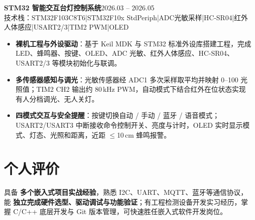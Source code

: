 \documentclass[10pt,a4paper]{article}
\newcommand{\projectblock}[3]{%
    {\bfseries\color{darktext}#1}\hfill{\color{graytext}#2}\\%
    {\small\color{graytext}#3}%
    \vspace{0.2em}%
}
\begin{document}
\projectblock{STM32 智能交互台灯控制系统}{2026.03 -- 2026.05}{技术栈：STM32F103C8T6\hspace{0.3em}|\hspace{0.3em}STM32F10x StdPeriph\hspace{0.3em}|\hspace{0.3em}ADC光敏采样\hspace{0.3em}|\hspace{0.3em}HC-SR04\hspace{0.3em}|\hspace{0.3em}红外人体感应\hspace{0.3em}|\hspace{0.3em}USART2/3\hspace{0.3em}|\hspace{0.3em}TIM2 PWM\hspace{0.3em}|\hspace{0.3em}OLED}

\begin{itemize}[leftmargin=1.5em, itemsep=2pt, parsep=0pt, topsep=2pt]
    \item \textbf{裸机工程与外设驱动}：基于 Keil MDK 与 STM32 标准外设库搭建工程，完成 LED、蜂鸣器、按键、OLED、ADC 光敏、红外人体感应、HC-SR04、USART2/3 等模块初始化与联调。
    \item \textbf{多传感器感知与调光}：光敏传感器经 ADC1 多次采样取平均并映射 0--100 光照值；TIM2 CH2 输出约 80\,kHz PWM，自动模式下结合红外在位状态实现有人分档调光、无人关灯。
    \item \textbf{四模式交互与安全提醒}：按键切换自动 / 手动 / 蓝牙 / 语音模式；USART2/USART3 中断接收命令控制开关、亮度与计时，OLED 实时显示模式、灯态、光照和距离，近距 $\leq$10\,cm 蜂鸣报警。
\end{itemize}

\vspace{0.1em}

\section{\faUser\hspace{0.4em}个人评价}

具备 \textbf{多个嵌入式项目实战经验}，熟悉 I2C、UART、MQTT、蓝牙等通信协议，能 \textbf{独立完成硬件选型、驱动调试与功能验证}；有工程检测设备开发实习经历，掌握 C/C++ 底层开发与 Git 版本管理，可快速胜任嵌入式软件开发岗位。
\end{document}
